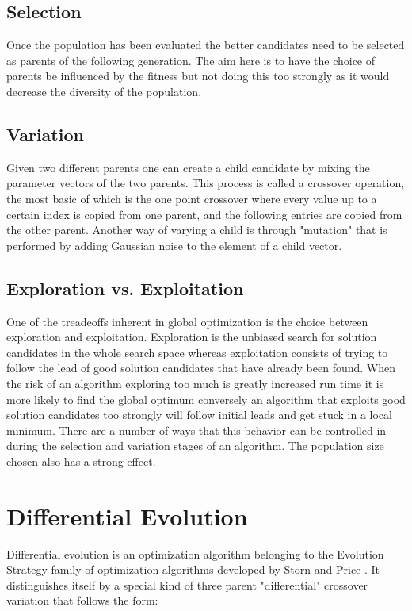 \documentclass[a4paper,titlepage]{report}
\begin{document}
\subsection{Selection}

Once the population has been evaluated the better candidates need to be selected as parents of the following generation. The aim here is to have the choice of parents be influenced by the fitness but not doing this too strongly as it would decrease the diversity of the population.


\subsection{Variation}

Given two different parents one can create a child candidate by mixing the parameter vectors of the two parents. This process is called a crossover operation, the most basic of which is the one point crossover where every value up to a certain index is copied from one parent, and the following entries are copied from the other parent. Another way of varying a child  is through "mutation" that is performed by adding Gaussian noise to the element of a child vector.


\subsection{Exploration vs. Exploitation}

One of the treadeoffs inherent in global optimization is the choice between exploration and exploitation. Exploration is the unbiased search for solution candidates in the whole search space whereas exploitation consists of trying to follow the lead of good solution candidates that have already been found. When the risk of an algorithm exploring too much is greatly increased run time it is more likely to find the global optimum conversely an algorithm that exploits good solution candidates too strongly will follow initial leads and get stuck in a local minimum. There are a number of ways that this behavior can be controlled in during the selection and variation stages of an algorithm. The population size chosen also has a strong effect.


\section{Differential Evolution}

Differential evolution is an optimization algorithm belonging to the Evolution Strategy family of optimization algorithms developed by Storn and Price \cite{storn}. It distinguishes itself by a special kind of three parent "differential" crossover variation that follows the form:
\end{document}
